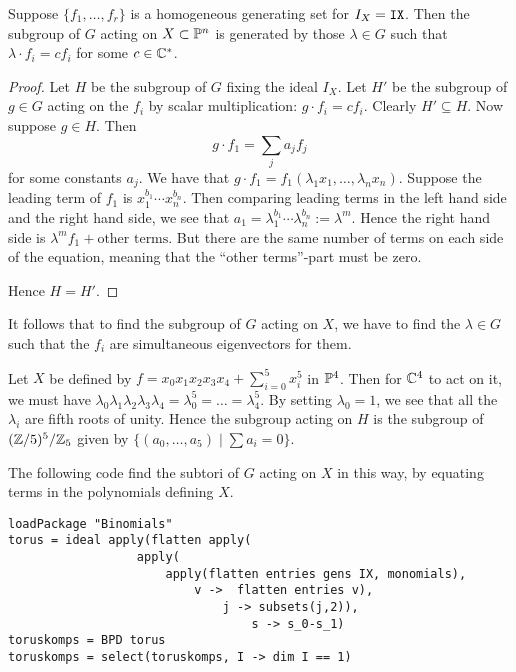 \begin{lemma}
Suppose $\{ f_1,\ldots, f_r \}$ is a homogeneous generating set for $I_X=\text{\texttt{IX}}$. Then the subgroup of $G$ acting on $X \subset \P^n$ is generated by those $\lambda \in G$ such that $\lambda \cdot f_i  = c f_i$ for some $c \in \C^\ast$.
\end{lemma}
\begin{proof}
Let $H$ be the subgroup of $G$ fixing the ideal $I_X$. Let $H'$ be the subgroup of $g \in G$ acting on the $f_i$ by scalar multiplication: $g \cdot f_i =c f_i$. Clearly $H' \subseteq H$.  Now suppose $g \in H$. Then
$$
g \cdot f_1 = \sum_j a_j f_j
$$
for some constants $a_j$. We have that $g \cdot f_1 = f_1(\lambda_1 x _1 ,\ldots, \lambda_n x_n)$. Suppose the leading term of $f_1$ is $x_1^{b_1}\cdots x_n^{b_n}$. Then comparing leading terms in the left hand side and the right hand side, we see that $a_1 = \lambda_1^{b_1}\cdots \lambda_n^{b_n} := \lambda^m$. Hence the right hand side is $\lambda^m f_1 + \text{other terms}$. But there are the same number of terms on each side of the equation, meaning that the ``other terms''-part must be zero.

Hence $H=H'$. 
\end{proof}

It follows that to find the subgroup of $G$ acting on $X$, we have to find the $\lambda \in G$ such that the $f_i$ are simultaneous eigenvectors for them.

\begin{example}
\label{example:torus}
Let  $X$ be defined by $f = x_0x_1x_2x_3x_4+\sum_{i=0}^5 x_i^5$ in $\P^4$. Then for $\C^4$ to act on it, we must have $\lambda_0\lambda_1\lambda_2\lambda_3\lambda_4=\lambda_0^5=\ldots=\lambda_4^5$. By setting $\lambda_0=1$, we see that all the $\lambda_i$ are fifth roots of unity. Hence the subgroup acting on $H$ is the subgroup of $(\Z/5)^5/\Z_5$ given by $\{ (a_0,\ldots,a_5) \mid \sum a_i = 0 \}$.
\end{example}

The following code find the subtori of $G$ acting on $X$ in this way, by equating terms in the polynomials defining $X$.

\begin{lstlisting}[language=Macaulay2]
loadPackage "Binomials"
torus = ideal apply(flatten apply(
                  apply(
                      apply(flatten entries gens IX, monomials),
                          v ->  flatten entries v), 
                              j -> subsets(j,2)),
                                  s -> s_0-s_1)
toruskomps = BPD torus
toruskomps = select(toruskomps, I -> dim I == 1)
\end{lstlisting}

